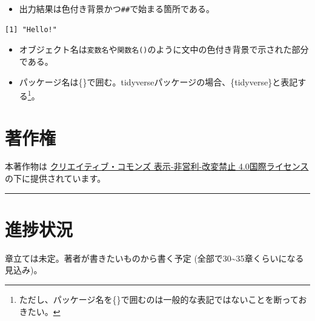 \documentclass[
  a4paper,
  pandoc,
  ja=standard,
  jafont=haranoaji]{bxjsbook}
\providecommand{\tightlist}{%
  \setlength{\itemsep}{0pt}\setlength{\parskip}{0pt}}
\begin{document}
\begin{itemize}
\tightlist
\item
  出力結果は色付き背景かつ\texttt{\#\#}で始まる箇所である。
\end{itemize}

\begin{verbatim}
[1] "Hello!"
\end{verbatim}

\begin{itemize}
\item
  オブジェクト名は\texttt{変数名}や\texttt{関数名()}のように文中の色付き背景で示された部分である。
\item
  パッケージ名は\{\}で囲む。tidyverseパッケージの場合、\{tidyverse\}と表記する\footnote{ただし、パッケージ名を\{\}で囲むのは一般的な表記ではないことを断っておきたい。}。
\end{itemize}

\hypertarget{ux8457ux4f5cux6a29}{%
\section*{著作権}\label{ux8457ux4f5cux6a29}}

本著作物は
\href{http://creativecommons.org/licenses/by-nc-nd/4.0/}{クリエイティブ・コモンズ
表示-非営利-改変禁止 4.0国際ライセンス}の下に提供されています。

\begin{center}\rule{0.5\linewidth}{0.5pt}\end{center}

\hypertarget{ux9032ux6357ux72b6ux6cc1}{%
\section*{進捗状況}\label{ux9032ux6357ux72b6ux6cc1}}

章立ては未定。著者が書きたいものから書く予定
(全部で30\textasciitilde35章くらいになる見込み)。
\end{document}
